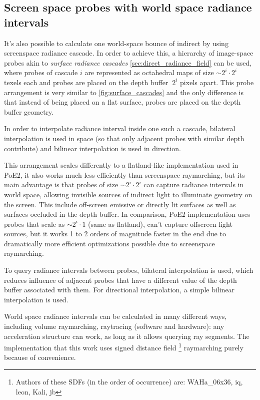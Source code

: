 \documentclass{jcgt}
\begin{document}
\clearpage
\subsection{Screen space probes with world space radiance intervals}
It's also possible to calculate one world-space bounce of indirect by using screenspace radiance cascade. In order to achieve this, a hierarchy of image-space probes akin to \emph{surface radiance cascades} \cref{sec:direct_radiance_field} can be used, where probes of cascade $i$ are represented as octahedral maps of size $\sim 2^i \cdot 2^i$ texels each and probes are placed on the depth buffer $~2^i$ pixels apart. This probe arrangement is very similar to \cref{fig:surface_cascades} and the only difference is that instead of being placed on a flat surface, probes are placed on the depth buffer geometry.

In order to interpolate radiance interval inside one such a cascade, bilateral interpolation is used in space (so that only adjacent probes with similar depth contribute) and bilinear interpolation is used in direction.

This arrangement scales differently to a flatland-like implementation used in PoE2, it also works much less efficiently than screenspace raymarching, but its main advantage is that probes of size $\sim 2^i \cdot 2^i$ can capture radiance intervals in world space, allowing invisible sources of indirect light to illuminate geometry on the screen. This include off-screen emissive or directly lit surfaces as well as surfaces occluded in the depth buffer. In comparison, PoE2 implementation uses probes that scale as $\sim 2^i \cdot 1$ (same as flatland), can't capture offscreen light sources, but it works 1 to 2 orders of magnitude faster in the end due to dramatically more efficient optimizations possible due to screenspace raymarching.

To query radiance intervals between probes, bilateral interpolation is used, which reduces influence of adjacent probes that have a different value of the depth buffer associated with them. For directional interpolation, a simple bilinear interpolation is used.

World space radiance intervals can be calculated in many different ways, including volume raymarching, raytracing (software and hardware): any acceleration structure can work, as long as it allows querying ray segments. The implementation that this work uses signed distance field  \footnote{Authors of these SDFs (in the order of occurrence) are:  WAHa\_06x36, iq, leon, Kali, jb} raymarching purely because of convenience.
\end{document}

